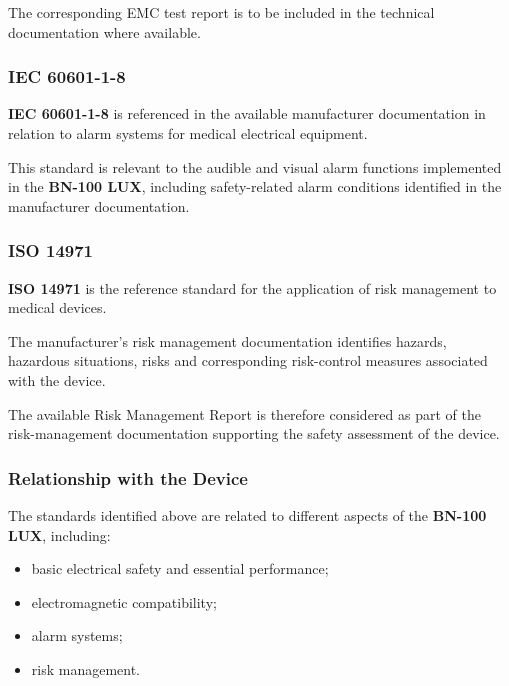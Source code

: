 The corresponding EMC test report is to be included in the technical
documentation where available.

\subsubsection{IEC 60601-1-8}

\textbf{IEC 60601-1-8} is referenced in the available manufacturer
documentation in relation to alarm systems for medical electrical equipment.

This standard is relevant to the audible and visual alarm functions
implemented in the \textbf{BN-100 LUX}, including safety-related alarm
conditions identified in the manufacturer documentation.

\subsubsection{ISO 14971}

\textbf{ISO 14971} is the reference standard for the application of risk
management to medical devices.

The manufacturer's risk management documentation identifies hazards,
hazardous situations, risks and corresponding risk-control measures
associated with the device.

The available Risk Management Report is therefore considered as part of the
risk-management documentation supporting the safety assessment of the
device.

\subsubsection{Relationship with the Device}

The standards identified above are related to different aspects of the
\textbf{BN-100 LUX}, including:

\begin{itemize}

    \item basic electrical safety and essential performance;

    \item electromagnetic compatibility;

    \item alarm systems;

    \item risk management.

\end{itemize}

